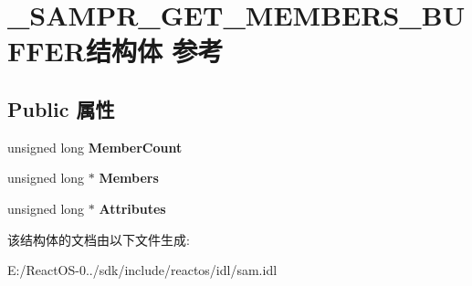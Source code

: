 \hypertarget{struct___s_a_m_p_r___g_e_t___m_e_m_b_e_r_s___b_u_f_f_e_r}{}\section{\+\_\+\+S\+A\+M\+P\+R\+\_\+\+G\+E\+T\+\_\+\+M\+E\+M\+B\+E\+R\+S\+\_\+\+B\+U\+F\+F\+E\+R结构体 参考}
\label{struct___s_a_m_p_r___g_e_t___m_e_m_b_e_r_s___b_u_f_f_e_r}
\subsection*{Public 属性}
\begin{DoxyCompactItemize}
\item 
\mbox{\label{struct___s_a_m_p_r___g_e_t___m_e_m_b_e_r_s___b_u_f_f_e_r_a8e175dc6c70095e391c670d2b3a2d8fa}} 
unsigned long {\bfseries Member\+Count}
\item 
\mbox{\label{struct___s_a_m_p_r___g_e_t___m_e_m_b_e_r_s___b_u_f_f_e_r_a0c04b07070e3e51bfbe45439c804560d}} 
unsigned long $\ast$ {\bfseries Members}
\item 
\mbox{\label{struct___s_a_m_p_r___g_e_t___m_e_m_b_e_r_s___b_u_f_f_e_r_aeb5918cf2d0f3e36e1fec98c5bf8c297}} 
unsigned long $\ast$ {\bfseries Attributes}
\end{DoxyCompactItemize}


该结构体的文档由以下文件生成\+:\begin{DoxyCompactItemize}
\item 
E\+:/\+React\+O\+S-\/0../sdk/include/reactos/idl/sam.\+idl\end{DoxyCompactItemize}
